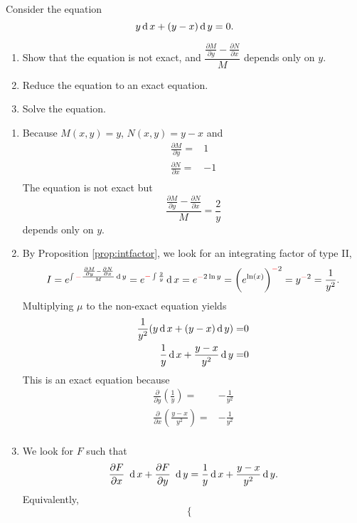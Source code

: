 \begin{example}
	Consider the equation
	\[y \operatorname{d} x+ (y-x) \operatorname{d} y  =0. \]
	\begin{enumerate}
		\item  Show that the equation is not exact, and $\dfrac{\frac{\partial M}{\partial y}- \frac{\partial N}{\partial x}}{M}$ depends only on $y$.
		\item Reduce the equation to an exact equation.
		\item Solve the equation.
	\end{enumerate}
\end{example}
\begin{solution}
	\begin{enumerate}
		\item Because $M(x, y)=y$, $N(x, y)=y-x$ and 
		\[
		\begin{split}
		\frac{\partial M}{\partial y} =&1 \\
		\frac{\partial N}{\partial x} =&-1 \\
		\end{split}
		\]
		The equation is not exact but
		\[\frac{\frac{\partial M}{\partial y} - \frac{\partial N}{\partial x}}{M}=  \frac{2}{y}\] 
		depends only on $y$.
		\item By Proposition \ref{prop:intfactor}, 
			we look for an integrating factor of type II,
		\[I= e^{\int {\color{red}-}\frac{\frac{\partial M}{\partial y} - \frac{\partial N}{\partial x}}{M}\operatorname{d} y} = e^{{\color{red}-}\int\frac{2}{y}} \operatorname{d} x=e^{{\color{red}-}2\ln y}=\bigg(e^{\ln(x)}\bigg)^{{\color{red}-}2}=y^{{\color{red}-}2}=\frac{1}{y^2}. \]
		Multiplying $\mu$ to the non-exact equation yields
		\[
      \begin{aligned}
        \frac{1}{y^2} (y  \operatorname{d} x + (y-x)\operatorname{d} y)=&0\\
        \frac{1}{y}  \operatorname{d} x+\frac{y-x}{y^2} \operatorname{d} y  =& 0
      \end{aligned}
      \]
		This is an exact equation because
		\[
		\begin{split}
		\frac{\partial}{\partial y}\left(\frac{1}{y}\right) =&-\frac{1}{y^2} \\
		\frac{\partial}{\partial x}\left(\frac{y-x}{y^2}\right)=&-\frac{1}{y^2} \\
		\end{split}
		\]
		\item We look for $F$ such that 
		\[\frac{\partial F}{\partial x} ~\operatorname{d} x+\frac{\partial F}{\partial y}~\operatorname{d} y=  \frac{1}{y} \operatorname{d} x+\frac{y-x}{y^2} \operatorname{d} y.\]
		Equivalently, 
		\[
		\begin{cases}

\end{cases}\]
\end{enumerate}
\end{solution}
